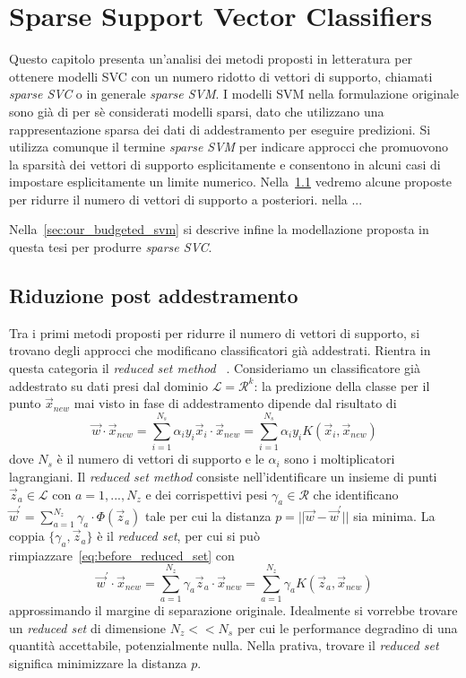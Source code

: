 \chapter{Sparse Support Vector Classifiers}\label{chap:sparse_svc}
Questo capitolo presenta un'analisi dei metodi proposti in letteratura per ottenere modelli SVC con un numero ridotto di vettori di supporto, chiamati \emph{sparse SVC} o in generale \emph{sparse SVM}.
I modelli SVM nella formulazione originale sono già di per sè considerati modelli sparsi, dato che utilizzano una rappresentazione sparsa dei dati di addestramento per eseguire predizioni. Si utilizza comunque il termine \emph{sparse SVM} per indicare approcci che promuovono la sparsità dei vettori di supporto esplicitamente e consentono in alcuni casi di impostare esplicitamente un limite numerico. 
Nella~\cref{sec:riduzione_post_processing} vedremo alcune proposte per ridurre il numero di vettori di supporto a posteriori. nella ...

Nella~\cref{sec:our_budgeted_svm} si descrive infine la modellazione proposta in questa tesi per produrre \emph{sparse SVC}.

\section{Riduzione post addestramento}\label{sec:riduzione_post_processing}
Tra i primi metodi proposti per ridurre il numero di vettori di supporto, si trovano degli approcci che modificano classificatori già addestrati. Rientra in questa categoria il \emph{reduced set method} ~\cite{reduced_set_method}. Consideriamo un classificatore già addestrato su dati presi dal dominio $\mathcal{L}=\mathcal{R}^k$: la predizione della classe per il punto $\Vec{x}_{new}$ mai visto in fase di addestramento dipende dal risultato di 
\begin{equation}\label{eq:before_reduced_set}
\Vec{w}\cdot\Vec{x}_{new} = \sum_{i=1}^{N_s} \alpha_iy_i\Vec{x}_i \cdot \Vec{x}_{new} = \sum_{i=1}^{N_s} \alpha_iy_iK(\Vec{x}_i, \Vec{x}_{new})
\end{equation}
dove $N_s$ è il numero di vettori di supporto e le $\alpha_i$ sono i moltiplicatori lagrangiani. Il \emph{reduced set method} consiste nell'identificare un insieme di punti $\Vec{z}_a \in \mathcal{L}$ con $a=1,...,N_z$ e dei corrispettivi pesi $\gamma_a \in \mathcal{R}$ che identificano $\Vec{w}^{'} = \sum_{a=1}^{N_z}\gamma_a\cdot\Phi(\Vec{z}_a)$ tale per cui la distanza $p = ||\Vec{w}-\Vec{w}^{'}||$ sia minima. La coppia $\{\gamma_a, \Vec{z}_a\}$ è il \emph{reduced set}, per cui si può rimpiazzare~\cref{eq:before_reduced_set} con
\begin{equation}\label{eq:reduced_set}
\Vec{w}^{'} \cdot \Vec{x}_{new} = \sum_{a=1}^{N_z}\gamma_a \Vec{z}_a\cdot \Vec{x}_{new} = \sum_{a=1}^{N_z}\gamma_a K(\Vec{z}_a, \Vec{x}_{new})
\end{equation}
approssimando il margine di separazione originale.
Idealmente si vorrebbe trovare un \emph{reduced set} di dimensione $N_z << N_s$ per cui le performance degradino di una quantità accettabile, potenzialmente nulla.
Nella prativa, trovare il \emph{reduced set} significa minimizzare la distanza $p$.


